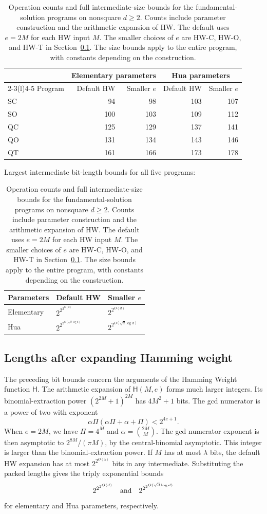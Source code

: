\documentclass[11pt]{article}
\theoremstyle{remark}
\begin{document}
\begin{table}[htbp]
\centering
\small
\begin{tabular}{@{}lrrrr@{}}
\toprule
&\multicolumn{2}{c}{Elementary parameters}&\multicolumn{2}{c}{Hua parameters}\\
\cmidrule(lr){2-3}\cmidrule(l){4-5}
Program & Default HW & Smaller $e$ & Default HW & Smaller $e$\\
\midrule
SC &94&98&103&107\\
SO &100&103&109&112\\
QC &125&129&137&141\\
QO &131&134&143&146\\
QT &161&166&173&178\\
\bottomrule
\end{tabular}

\medskip
Largest intermediate bit-length bounds for all five programs:
\medskip

{\renewcommand{\arraystretch}{1.6}
\begin{tabular}{@{}lll@{}}
\toprule
Parameters & Default HW & Smaller $e$\\
\midrule
Elementary & $2^{2^{2^{O(d)}}}$ & $2^{2^{O(d)}}$\\
Hua & $2^{2^{2^{O(\sqrt d\log d)}}}$ & $2^{2^{O(\sqrt d\log d)}}$\\
\bottomrule
\end{tabular}}
\caption{Operation counts and full intermediate-size bounds for the
fundamental-solution programs on nonsquare $d\ge2$. Counts include
parameter construction and the arithmetic expansion of HW. The default
uses $e=2M$ for each HW input $M$. The smaller choices of $e$ are HW-C,
HW-O, and HW-T in Section~\ref{sec:expanded-size}. The size bounds apply
to the entire program, with constants depending on the construction.}
\label{tab:parameters}
\end{table}

\subsection{Lengths after expanding Hamming weight}\label{sec:expanded-size}

The preceding bit bounds concern the arguments of the Hamming Weight function $\mathsf H$. The arithmetic expansion of $\mathsf H(M,e)$ forms much larger integers.
Its binomial-extraction power $(2^{2M}+1)^{2M}$ has $4M^2+1$ bits.
The gcd numerator is a power of two with exponent
\[
  \alpha\Pi(\alpha\Pi+\alpha+\Pi)<2^{4e+1}.
\]
When $e=2M$, we have $\Pi=4^M$ and $\alpha=\binom{2M}{M}$.
The gcd numerator exponent is then asymptotic to
$2^{8M}/(\pi M)$, by the central-binomial asymptotic.
This integer is larger than the binomial-extraction power. If $M$ has
at most $\lambda$ bits, the default HW expansion has at most
$2^{2^{O(\lambda)}}$ bits in any intermediate. Substituting the packed
lengths gives the triply exponential bounds
\[
  2^{2^{2^{O(d)}}}\quad\hbox{and}\quad
  2^{2^{2^{O(\sqrt d\log d)}}}
\]
for elementary and Hua parameters, respectively.
\end{document}
